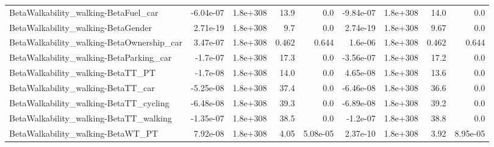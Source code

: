 \begin{tabular}{lrrrrrrrr}
BetaWalkability_walking-BetaFuel_car & -6.04e-07 & 1.8e+308 & 13.9 & 0.0 & -9.84e-07 & 1.8e+308 & 14.0 & 0.0 \\
BetaWalkability_walking-BetaGender & 2.71e-19 & 1.8e+308 & 9.7 & 0.0 & 2.74e-19 & 1.8e+308 & 9.67 & 0.0 \\
BetaWalkability_walking-BetaOwnership_car & 3.47e-07 & 1.8e+308 & 0.462 & 0.644 & 1.6e-06 & 1.8e+308 & 0.462 & 0.644 \\
BetaWalkability_walking-BetaParking_car & -1.7e-07 & 1.8e+308 & 17.3 & 0.0 & -3.56e-07 & 1.8e+308 & 17.2 & 0.0 \\
BetaWalkability_walking-BetaTT_PT & -1.7e-08 & 1.8e+308 & 14.0 & 0.0 & 4.65e-08 & 1.8e+308 & 13.6 & 0.0 \\
BetaWalkability_walking-BetaTT_car & -5.25e-08 & 1.8e+308 & 37.4 & 0.0 & -6.46e-08 & 1.8e+308 & 36.6 & 0.0 \\
BetaWalkability_walking-BetaTT_cycling & -6.48e-08 & 1.8e+308 & 39.3 & 0.0 & -6.89e-08 & 1.8e+308 & 39.2 & 0.0 \\
BetaWalkability_walking-BetaTT_walking & -1.35e-07 & 1.8e+308 & 38.5 & 0.0 & -1.2e-07 & 1.8e+308 & 38.8 & 0.0 \\
BetaWalkability_walking-BetaWT_PT & 7.92e-08 & 1.8e+308 & 4.05 & 5.08e-05 & 2.37e-10 & 1.8e+308 & 3.92 & 8.95e-05 \\
\end{tabular}
